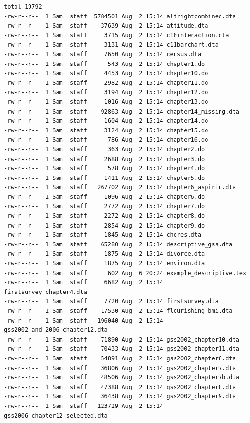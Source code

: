 \documentclass[
]{book}
\begin{document}
\begin{verbatim}
total 19792
-rw-r--r--  1 Sam  staff  5784501 Aug  2 15:14 altrightcombined.dta
-rw-r--r--  1 Sam  staff    37639 Aug  2 15:14 attitude.dta
-rw-r--r--  1 Sam  staff     3715 Aug  2 15:14 c10interaction.dta
-rw-r--r--  1 Sam  staff     3131 Aug  2 15:14 c11barchart.dta
-rw-r--r--  1 Sam  staff     7650 Aug  2 15:14 census.dta
-rw-r--r--  1 Sam  staff      543 Aug  2 15:14 chapter1.do
-rw-r--r--  1 Sam  staff     4453 Aug  2 15:14 chapter10.do
-rw-r--r--  1 Sam  staff     2982 Aug  2 15:14 chapter11.do
-rw-r--r--  1 Sam  staff     3194 Aug  2 15:14 chapter12.do
-rw-r--r--  1 Sam  staff     1016 Aug  2 15:14 chapter13.do
-rw-r--r--  1 Sam  staff    92863 Aug  2 15:14 chapter14_missing.dta
-rw-r--r--  1 Sam  staff     1604 Aug  2 15:14 chapter14.do
-rw-r--r--  1 Sam  staff     3124 Aug  2 15:14 chapter15.do
-rw-r--r--  1 Sam  staff      786 Aug  2 15:14 chapter16.do
-rw-r--r--  1 Sam  staff      363 Aug  2 15:14 chapter2.do
-rw-r--r--  1 Sam  staff     2688 Aug  2 15:14 chapter3.do
-rw-r--r--  1 Sam  staff      578 Aug  2 15:14 chapter4.do
-rw-r--r--  1 Sam  staff     1411 Aug  2 15:14 chapter5.do
-rw-r--r--  1 Sam  staff   267702 Aug  2 15:14 chapter6_aspirin.dta
-rw-r--r--  1 Sam  staff     1096 Aug  2 15:14 chapter6.do
-rw-r--r--  1 Sam  staff     2772 Aug  2 15:14 chapter7.do
-rw-r--r--  1 Sam  staff     2272 Aug  2 15:14 chapter8.do
-rw-r--r--  1 Sam  staff     2854 Aug  2 15:14 chapter9.do
-rw-r--r--  1 Sam  staff     1845 Aug  2 15:14 chores.dta
-rw-r--r--  1 Sam  staff    65280 Aug  2 15:14 descriptive_gss.dta
-rw-r--r--  1 Sam  staff     1875 Aug  2 15:14 divorce.dta
-rw-r--r--  1 Sam  staff     1875 Aug  2 15:14 environ.dta
-rw-r--r--  1 Sam  staff      602 Aug  6 20:24 example_descriptive.tex
-rw-r--r--  1 Sam  staff     6682 Aug  2 15:14 firstsurvey_chapter4.dta
-rw-r--r--  1 Sam  staff     7720 Aug  2 15:14 firstsurvey.dta
-rw-r--r--  1 Sam  staff    17530 Aug  2 15:14 flourishing_bmi.dta
-rw-r--r--  1 Sam  staff   196040 Aug  2 15:14 gss2002_and_2006_chapter12.dta
-rw-r--r--  1 Sam  staff    71890 Aug  2 15:14 gss2002_chapter10.dta
-rw-r--r--  1 Sam  staff    70433 Aug  2 15:14 gss2002_chapter11.dta
-rw-r--r--  1 Sam  staff    54891 Aug  2 15:14 gss2002_chapter6.dta
-rw-r--r--  1 Sam  staff    36806 Aug  2 15:14 gss2002_chapter7.dta
-rw-r--r--  1 Sam  staff    48506 Aug  2 15:14 gss2002_chapter7b.dta
-rw-r--r--  1 Sam  staff    47388 Aug  2 15:14 gss2002_chapter8.dta
-rw-r--r--  1 Sam  staff    36438 Aug  2 15:14 gss2002_chapter9.dta
-rw-r--r--  1 Sam  staff   123729 Aug  2 15:14 gss2006_chapter12_selected.dta

\end{verbatim}
\end{document}
